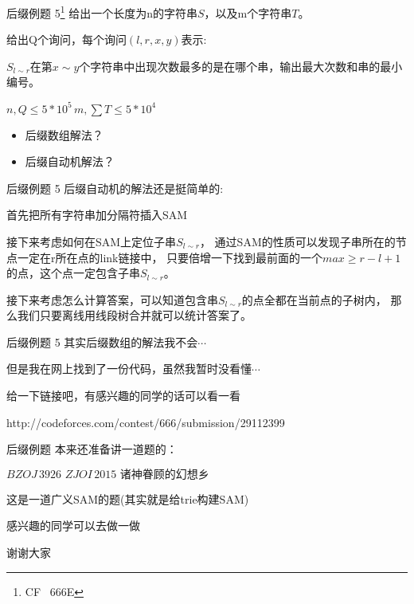 \documentclass[10pt]{beamer}
\begin{document}
	\begin{frame}{后缀例题 5\footnote{CF $\,$ 666E}}
		给出一个长度为n的字符串$S$，以及m个字符串$T$。

		给出Q个询问，每个询问$(l,r,x,y)$表示:

		$S_{l \sim r}$在第$x \sim y$个字符串中出现次数最多的是在哪个串，输出最大次数和串的最小编号。

		\vspace{2ex}

		$ n,Q \leq 5*10^5 \, m,\sum T \leq 5*10^4$

		\vspace{2ex}

		\begin{itemize}
			\item 后缀数组解法？

			\vspace{2ex}

			\item 后缀自动机解法？
		\end{itemize}
	\end{frame}
	\begin{frame}{后缀例题 5}
		后缀自动机的解法还是挺简单的:

		首先把所有字符串加分隔符插入SAM\pause

		接下来考虑如何在SAM上定位子串$S_{l \sim r}$，
		通过SAM的性质可以发现子串所在的节点一定在r所在点的link链接中，
		只要倍增一下找到最前面的一个$max \geq r-l+1$的点，这个点一定包含子串$S_{l \sim r}$。\pause

		\vspace{2ex}

		接下来考虑怎么计算答案，可以知道包含串$S_{l \sim r}$的点全都在当前点的子树内，
		那么我们只要离线用线段树合并就可以统计答案了。

	\end{frame}
	\begin{frame}{后缀例题 5}
		其实后缀数组的解法我不会$\cdots$
		
		但是我在网上找到了一份代码，虽然我暂时没看懂$\cdots$\pause

		\vspace{2ex}

		给一下链接吧，有感兴趣的同学的话可以看一看

		http://codeforces.com/contest/666/submission/29112399

	\end{frame}
	\begin{frame}{后缀例题}
		本来还准备讲一道题的：

		\vspace{2ex}

		$BZOJ \, 3926 \,\, ZJOI\,2015 \,\, \text{诸神眷顾的幻想乡}$\pause

		\vspace{2ex}

		这是一道广义SAM的题(其实就是给trie构建SAM)

		\vspace{2ex}

		感兴趣的同学可以去做一做
	\end{frame}
	\begin{frame}
		\Huge{谢谢大家}		
	\end{frame}
\end{document}
